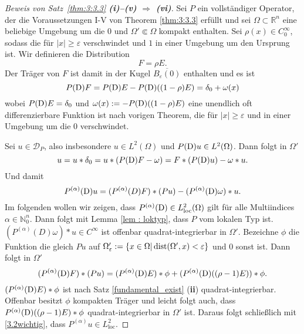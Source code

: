 %
%
%
%

\begin{proof}[Beweis von Satz~\ref{thm:3:3.3} {\bf (i)--(v) $\Longrightarrow$ (vi)}]
Sei $P$ ein vollständiger Operator, der die Voraussetzungen I-V von Theorem \ref{thm:3:3.3} erfüllt und sei $\Omega\subset \mathbb R^n$ eine beliebige Umgebung um die $0$ und $\Omega'\Subset \Omega$ kompakt enthalten.  Sei $\rho(x)\in C_0^\infty$, sodass die für $|x|\ge \varepsilon$ verschwindet und $1$ in einer Umgebung um den Ursprung ist. Wir definieren die Distribution
\begin{equation}
F= \rho E.
\end{equation}
Der Träger von $F$ ist damit in der Kugel $\overline {B_{\varepsilon}(0)}$ enthalten und es ist
\begin{equation}
P(\mathrm D) F= P(\mathrm D) E - P(\mathrm D)((1-\rho)E) =\delta_0 + \omega(x)
\end{equation}  
wobei $P(\mathrm D)E=\delta_0$ und $\omega(x):= -P(\mathrm D)((1-\rho)E)$ eine unendlich oft differenzierbare Funktion ist nach vorigen Theorem, die für $|x|\ge \varepsilon$ und in einer Umgebung um die $0$ verschwindet.  

Sei $u\in \mathcal D_{P}$, also insbesondere $u\in L^2(\Omega)$ und $P(\mathrm D)u\in L^2(\Omega)$.  Dann folgt in $\Omega'$
\begin{equation}
u= u*\delta_0 = u * (P(\mathrm D) F-\omega) = F*(P(\mathrm D)u)- \omega *u.
\end{equation}
Und damit
\begin{equation}\label{3.2wichtig}
P^{(\alpha)}(\mathrm D) u = (P^{(\alpha)}(D)F)*(Pu)-(P^{(\alpha)}(\mathrm D) \omega)*u.
\end{equation}
Im folgenden wollen wir zeigen, dass $P^{(\alpha)}(\mathrm D)\in L^2_{\text{loc}}(\Omega)$ gilt für alle Multiindices $\alpha\in \mathbb N_0^n$. Dann folgt mit Lemma \ref{lem : loktyp}, dass $P$ vom lokalen Typ ist.  $(P^{(\alpha)}(D)\omega)*u\in C^\infty$ ist offenbar quadrat-integrierbar in $\Omega'$. 
Bezeichne $\phi$ die Funktion die gleich $Pu$ auf $\Omega'_\varepsilon:=\{x\in \Omega| \operatorname{dist}(\Omega', x)<\varepsilon\}$ und $0$ sonst ist. Dann folgt in $\Omega'$
\begin{equation}
(P^{(\alpha)}(\mathrm D)F)* (Pu) = (P^{(\alpha)}(\mathrm D)E)*\phi+ (P^{(\alpha)}(\mathrm D)((\rho-1)E))*\phi.
\end{equation}
$(P^{(\alpha)}(\mathrm D)E)*\phi$ ist nach Satz \ref{fundamental_exist} ({\bf ii}) quadrat-integrierbar. Offenbar besitzt $\phi$ kompakten Träger und leicht folgt auch, dass $P^{(\alpha)}(\mathrm D)((\rho-1)E)*\phi$ quadrat-integrierbar in $\Omega'$  ist. Daraus folgt schließlich mit \eqref{3.2wichtig}, dass $P^{(\alpha)}u\in L^2_{\text{loc}}$.
\end{proof}



